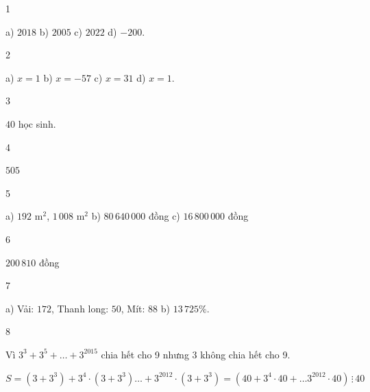 \begin{Solbook}{1}
 \par \noindent a) $2018$ \hfill b) $2005$ \hfill c) $2022$ \hfill d) $-200$.  \hfill \qedEX 
\end{Solbook}
\begin{Solbook}{2}
 \par \noindent a) $x=1$ \hfill b) $x=-57$ \hfill c) $x=31$ \hfill d) $x=1$.  \hfill \qedEX 
\end{Solbook}
\begin{Solbook}{3}
 \par \noindent $40$ học sinh. \hfill \qedEX 
\end{Solbook}
\begin{Solbook}{4}
 \par \noindent $505$ \hfill \qedEX 
\end{Solbook}
\begin{Solbook}{5}
 \par \noindent a) $192$ m$^2$, $1\,008$ m$^2$ \hfill b) $80\,640\,000$ đồng \hfill c) $16\,800\,000$ đồng  \hfill \qedEX 
\end{Solbook}
\begin{Solbook}{6}
 \par \noindent $200\,810$ đồng \hfill \qedEX 
\end{Solbook}
\begin{Solbook}{7}
 \par \noindent a) Vải: $172$, Thanh long: $50$, Mít: $88$ \hfill b) $13\,725\%$.  \hfill \qedEX 
\end{Solbook}
\begin{Solbook}{8}
 \par \noindent \begin {listEX} \item Vì $3^3+3^5+\ldots +3^{2015}$ chia hết cho 9 nhưng 3 không chia hết cho 9. \item $S=(3+3^3)+3^4\cdot (3+3^3) \ldots +3^{2012}\cdot (3+3^3)=(40+3^4\cdot 40+\ldots 3^{2012}\cdot 40)\, \vdots \, 40$\end {listEX} \hfill \qedEX 
\end{Solbook}
